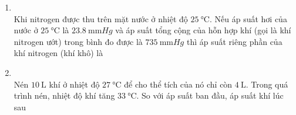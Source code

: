 \begin{enumerate}[label=\bfseries Câu \arabic*:, leftmargin=1.7cm]
\item {}\\
Khi nitrogen được thu trên mặt nước ở nhiệt độ $\SI{25}{\celsius}$. Nếu áp suất hơi của nước ở $\SI{25}{\celsius}$ là $\SI{23.8}{\milli\meter Hg}$ và áp suất tổng cộng của hỗn hợp khí (gọi là khí nitrogen ướt) trong bình đo được là $\SI{735}{\milli\meter Hg}$ thì áp suất riêng phần của khí nitrogen (khí khô) là
\item {}\\
Nén $\SI{10}{\liter}$ khí ở nhiệt độ $\SI{27}{\celsius}$ để cho thể tích của nó chỉ còn $\SI{4}{\liter}$. Trong quá trình nén, nhiệt độ khí tăng $\SI{33}{\celsius}$. So với áp suất ban đầu, áp suất khí lúc sau


\end{enumerate}
